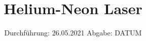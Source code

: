 

\subject{V 61}
\title{Helium-Neon Laser}
\date{%
  Durchführung: 26.05.2021
  \hspace{3em}
  Abgabe: DATUM
}



\maketitle
\thispagestyle{empty}
\tableofcontents
\newpage






%

\printbibliography{}


